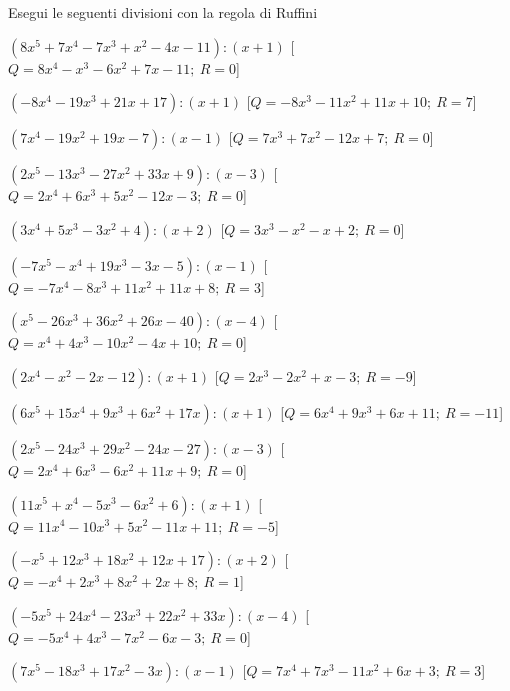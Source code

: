 \begin{esercizio}\label{ese:}
 Esegui le seguenti divisioni con la regola di Ruffini
 \begin{enumeratea}
  \item  \(\left(8 x^5 +7 x^4 -7 x^3 + x^2 -4 x -11 \right) : 
           \left(x +1 \right)\)
   \hfill [\(Q = 8 x^4 - x^3 -6 x^2 +7 x -11;~R = 0\)]
  \item  \(\left(-8 x^4 -19 x^3 +21 x +17 \right) : \left(x +1 \right)\)
   \hfill [\(Q = -8 x^3 -11 x^2 +11 x +10;~R = 7\)]
  \item  \(\left(7 x^4 -19 x^2 +19 x -7 \right) : \left(x -1 \right)\)
   \hfill [\(Q = 7 x^3 +7 x^2 -12 x +7;~R = 0\)]
  \item  \(\left(2 x^5 -13 x^3 -27 x^2 +33 x +9 \right) : 
           \left(x -3 \right)\)
   \hfill [\(Q = 2 x^4 +6 x^3 +5 x^2 -12 x -3;~R = 0\)]
  \item  \(\left(3 x^4 +5 x^3 -3 x^2 +4 \right) : \left(x +2 \right)\)
   \hfill [\(Q = 3 x^3 - x^2 - x +2;~R = 0\)]
  \item  \(\left(-7 x^5 - x^4 +19 x^3 -3 x -5 \right) : \left(x -1 \right)\)
   \hfill [\(Q = -7 x^4 -8 x^3 +11 x^2 +11 x +8;~R = 3\)]
  \item  \(\left(x^5 -26 x^3 +36 x^2 +26 x -40 \right) : 
           \left(x -4 \right)\)
   \hfill [\(Q = x^4 +4 x^3 -10 x^2 -4 x +10;~R = 0\)]
  \item  \(\left(2 x^4 - x^2 -2 x -12 \right) : \left(x +1 \right)\)
   \hfill [\(Q = 2 x^3 -2 x^2 + x -3;~R = -9\)]
  \item  \(\left(6 x^5 +15 x^4 +9 x^3 +6 x^2 +17 x  \right) : 
           \left(x +1 \right)\)
   \hfill [\(Q = 6 x^4 +9 x^3 +6 x +11;~R = -11\)]
  \item  \(\left(2 x^5 -24 x^3 +29 x^2 -24 x -27 \right) : 
           \left(x -3 \right)\)
   \hfill [\(Q = 2 x^4 +6 x^3 -6 x^2 +11 x +9;~R = 0\)]
  \item  \(\left(11 x^5 + x^4 -5 x^3 -6 x^2 +6 \right) : \left(x +1 \right)\)
   \hfill [\(Q = 11 x^4 -10 x^3 +5 x^2 -11 x +11;~R = -5\)]
  \item  \(\left(- x^5 +12 x^3 +18 x^2 +12 x +17 \right) : \left(x +2 \right)\)
   \hfill [\(Q = - x^4 +2 x^3 +8 x^2 +2 x +8;~R = 1\)]
  \item  \(\left(-5 x^5 +24 x^4 -23 x^3 +22 x^2 +33 x  \right) : 
           \left(x -4 \right)\)
   \hfill [\(Q = -5 x^4 +4 x^3 -7 x^2 -6 x -3;~R = 0\)]
  \item  \(\left(7 x^5 -18 x^3 +17 x^2 -3 x  \right) : \left(x -1 \right)\)
   \hfill [\(Q = 7 x^4 +7 x^3 -11 x^2 +6 x +3;~R = 3\)]

\end{enumeratea}
\end{esercizio}
